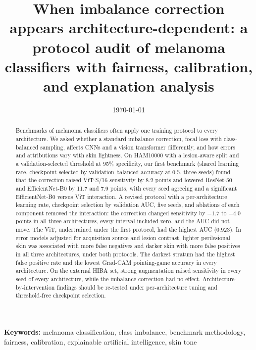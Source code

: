 \documentclass[11pt]{article}
\title{When imbalance correction appears architecture-dependent: a protocol audit of melanoma classifiers with fairness, calibration, and explanation analysis}
\author{}
\date{\today}
\begin{document}
\maketitle

\begin{abstract}
Benchmarks of melanoma classifiers often apply one training protocol to every architecture. We asked whether a standard imbalance correction, focal loss with class-balanced sampling, affects CNNs and a vision transformer differently, and how errors and attributions vary with skin lightness. On HAM10000 with a lesion-aware split and a validation-selected threshold at 95\% specificity, our first benchmark (shared learning rate, checkpoint selected by validation balanced accuracy at 0.5, three seeds) found that the correction raised ViT-S/16 sensitivity by 8.2 points and lowered ResNet-50 and EfficientNet-B0 by 11.7 and 7.9 points, with every seed agreeing and a significant EfficientNet-B0 versus ViT interaction. A revised protocol with a per-architecture learning rate, checkpoint selection by validation AUC, five seeds, and ablations of each component removed the interaction: the correction changed sensitivity by $-1.7$ to $-4.0$ points in all three architectures, every interval included zero, and the AUC did not move. The ViT, undertrained under the first protocol, had the highest AUC (0.923). In error models adjusted for acquisition source and lesion contrast, lighter perilesional skin was associated with more false negatives and darker skin with more false positives in all three architectures, under both protocols. The darkest stratum had the highest false positive rate and the lowest Grad-CAM pointing-game accuracy in every architecture. On the external HIBA set, strong augmentation raised sensitivity in every seed of every architecture, while the imbalance correction had no effect. Architecture-by-intervention findings should be re-tested under per-architecture tuning and threshold-free checkpoint selection.
\end{abstract}

\noindent\textbf{Keywords:} melanoma classification, class imbalance, benchmark methodology, fairness, calibration, explainable artificial intelligence, skin tone












\end{document}
